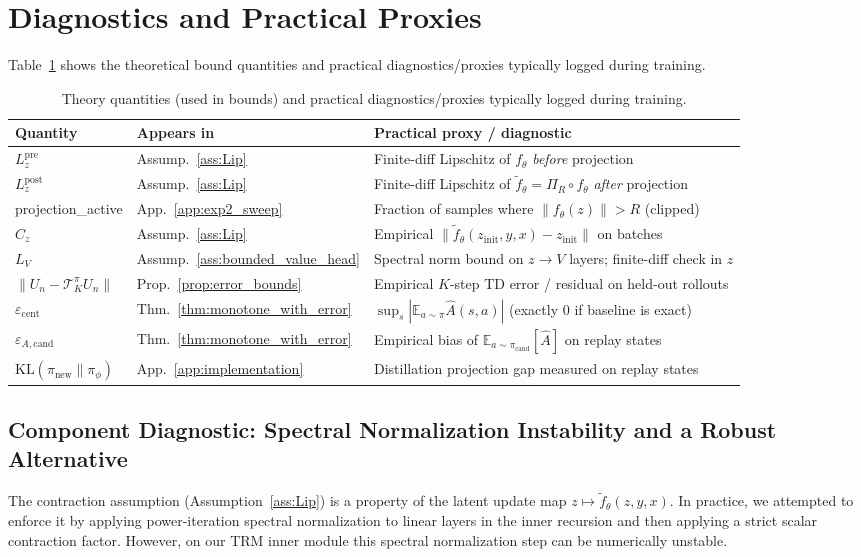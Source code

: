 \documentclass{article}
\theoremstyle{plain}
\theoremstyle{definition}
\theoremstyle{remark}
\newcommand{\E}{\mathbb{E}}
\newcommand{\KL}{\mathrm{KL}}
\begin{document}
\section{Diagnostics and Practical Proxies}
\label{app:diagnostics}

Table~\ref{tab:diagnostics} shows the theoretical bound quantities and practical diagnostics/proxies typically logged during training.

\begin{table}[t]
\caption{Theory quantities (used in bounds) and practical diagnostics/proxies typically logged during training.}
\label{tab:diagnostics}
\centering
\small
\begin{tabular}{@{}lll@{}}
\toprule
Quantity & Appears in & Practical proxy / diagnostic \\
\midrule
$L_z^{\mathrm{pre}}$ & Assump.~\ref{ass:Lip} & Finite-diff Lipschitz of $f_\theta$ \emph{before} projection \\
$L_z^{\mathrm{post}}$ & Assump.~\ref{ass:Lip} & Finite-diff Lipschitz of $\tilde f_\theta{=}\Pi_R\circ f_\theta$ \emph{after} projection \\
projection\_active & App.~\ref{app:exp2_sweep} & Fraction of samples where $\|f_\theta(z)\|>R$ (clipped) \\
$C_z$ & Assump.~\ref{ass:Lip} & Empirical $\|\tilde f_\theta(z_{\mathrm{init}},y,x)-z_{\mathrm{init}}\|$ on batches \\
$L_V$ & Assump.~\ref{ass:bounded_value_head} & Spectral norm bound on $z\!\to\!V$ layers; finite-diff check in $z$ \\
$\|U_n-\mathcal{T}^\pi_K U_n\|$ & Prop.~\ref{prop:error_bounds} & Empirical $K$-step TD error / residual on held-out rollouts \\
$\varepsilon_{\mathrm{cent}}$ & Thm.~\ref{thm:monotone_with_error} & $\sup_s|\E_{a\sim\pi}\widehat A(s,a)|$ (exactly $0$ if baseline is exact) \\
$\varepsilon_{A,\mathrm{cand}}$ & Thm.~\ref{thm:monotone_with_error} & Empirical bias of $\E_{a\sim\pi_{\mathrm{cand}}}[\widehat A]$ on replay states \\
$\KL(\pi_{\mathrm{new}}\|\pi_\phi)$ & App.~\ref{app:implementation} & Distillation projection gap measured on replay states \\
\bottomrule
\end{tabular}
\end{table}

\subsection{Component Diagnostic: Spectral Normalization Instability and a Robust Alternative}
\label{app:sn_instability}
The contraction assumption (Assumption~\ref{ass:Lip}) is a property of the latent update map $z\mapsto \tilde f_\theta(z,y,x)$.
In practice, we attempted to enforce it by applying power-iteration spectral normalization to linear layers in the inner recursion and then applying a strict scalar contraction factor.
However, on our TRM inner module this spectral normalization step can be numerically unstable.
\end{document}
